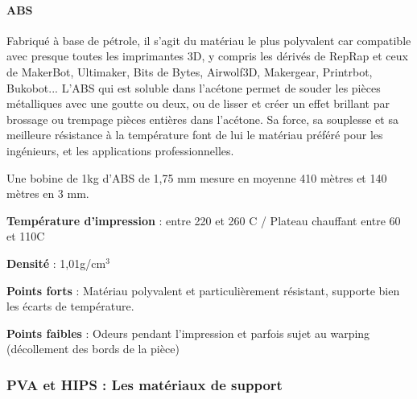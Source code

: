 \documentclass{article}
\begin{document}
\paragraph{ABS} \hfill 

Fabriqué à base de pétrole, il s'agit du matériau le plus polyvalent car compatible avec presque toutes les imprimantes 3D, y compris les dérivés de RepRap et ceux de MakerBot, Ultimaker, Bits de Bytes, Airwolf3D, Makergear, Printrbot, Bukobot... L'ABS qui est soluble dans l'acétone permet de souder les pièces métalliques avec une goutte ou deux, ou de lisser et créer un effet brillant par brossage ou trempage pièces entières dans l'acétone. Sa force, sa souplesse et sa meilleure résistance à la température font de lui le matériau préféré pour les ingénieurs, et les applications professionnelles.\hfill
 \par\leavevmode\par
Une bobine de 1kg d'ABS de 1,75 mm mesure en moyenne 410 mètres et 140 mètres en 3 mm.\hfill
 \par\leavevmode\par
\textbf{Température d'impression} : entre 220 et 260 \degres C / Plateau chauffant entre 60 et 110\degres C\hfill

\textbf{Densité} : 1,01g/cm$^{3}$\hfill

\textbf{Points forts} : Matériau polyvalent et particulièrement résistant, supporte bien les écarts de température.\hfill

\textbf{Points faibles} : Odeurs pendant l'impression et parfois sujet au warping (décollement des bords de la
pièce)\hfill
 \par\leavevmode\par
{}
\newpage
\subsubsection{PVA et HIPS : Les matériaux de support}
\end{document}

